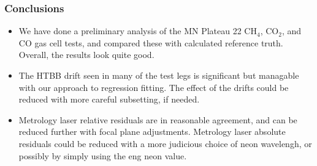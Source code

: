 \documentclass[9pt]{beamer}
\begin{document}
\begin{frame}
\frametitle{Conclusions}
\begin{itemize}

  \item We have done a preliminary analysis of the MN Plateau 22
    CH$_4$, CO$_2$, and CO gas cell tests, and compared these with
    calculated reference truth.  Overall, the results look quite
    good.

  \item The HTBB drift seen in many of the test legs is significant
    but managable with our approach to regression fitting.   The effect
    of the drifts could be reduced with more careful subsetting, if
    needed.

  \item Metrology laser relative residuals are in reasonable
    agreement, and can be reduced further with focal plane
    adjustments.  Metrology laser absolute residuals could be
    reduced with a more judicious choice of neon wavelengh, or 
    possibly by simply using the eng neon value.

\end{itemize}
\end{frame}
\end{document}
